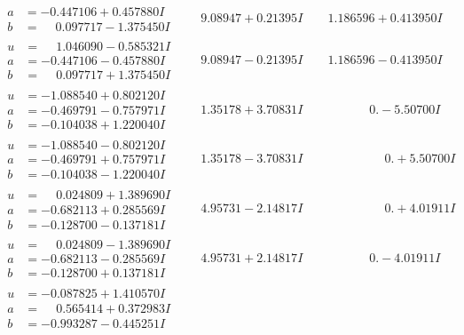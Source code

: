 \documentclass[1p]{elsarticle_modified}
\theoremstyle{definition}
\begin{document}
$$\begin{array}{c|c|c}
\begin{aligned}
a &= -0.447106 + 0.457880 I \\
b &= \phantom{-}0.097717 - 1.375450 I\end{aligned}
 & \phantom{-}9.08947 + 0.21395 I & \phantom{-}1.186596 + 0.413950 I \\ \hline\begin{aligned}
u &= \phantom{-}1.046090 - 0.585321 I \\
a &= -0.447106 - 0.457880 I \\
b &= \phantom{-}0.097717 + 1.375450 I\end{aligned}
 & \phantom{-}9.08947 - 0.21395 I & \phantom{-}1.186596 - 0.413950 I \\ \hline\begin{aligned}
u &= -1.088540 + 0.802120 I \\
a &= -0.469791 - 0.757971 I \\
b &= -0.104038 + 1.220040 I\end{aligned}
 & \phantom{-}1.35178 + 3.70831 I & \phantom{-0.000000 } 0. - 5.50700 I \\ \hline\begin{aligned}
u &= -1.088540 - 0.802120 I \\
a &= -0.469791 + 0.757971 I \\
b &= -0.104038 - 1.220040 I\end{aligned}
 & \phantom{-}1.35178 - 3.70831 I & \phantom{-0.000000 -}0. + 5.50700 I \\ \hline\begin{aligned}
u &= \phantom{-}0.024809 + 1.389690 I \\
a &= -0.682113 + 0.285569 I \\
b &= -0.128700 - 0.137181 I\end{aligned}
 & \phantom{-}4.95731 - 2.14817 I & \phantom{-0.000000 -}0. + 4.01911 I \\ \hline\begin{aligned}
u &= \phantom{-}0.024809 - 1.389690 I \\
a &= -0.682113 - 0.285569 I \\
b &= -0.128700 + 0.137181 I\end{aligned}
 & \phantom{-}4.95731 + 2.14817 I & \phantom{-0.000000 } 0. - 4.01911 I \\ \hline\begin{aligned}
u &= -0.087825 + 1.410570 I \\
a &= \phantom{-}0.565414 + 0.372983 I \\
b &= -0.993287 - 0.445251 I\end{aligned}

\end{array}$$
\end{document}
